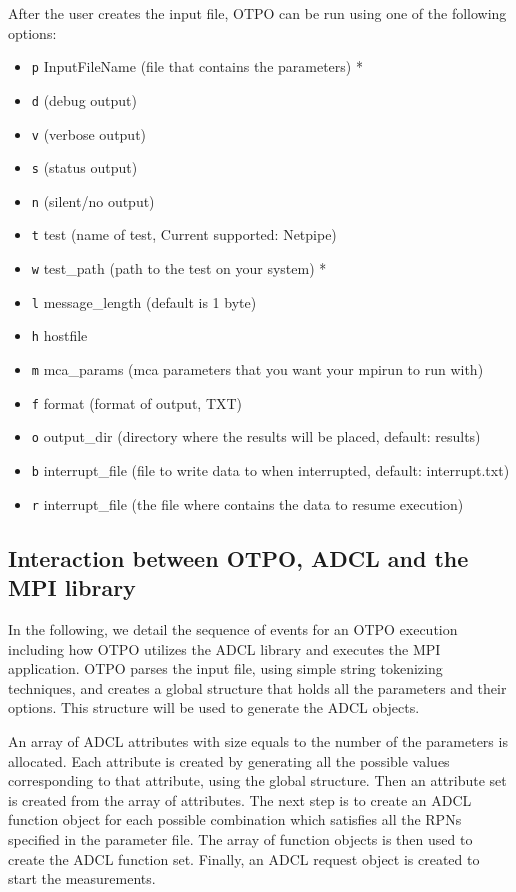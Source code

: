 After the user creates the input file, OTPO can be run using one of the following options:
\begin{itemize}
\item {\tt p} InputFileName (file that contains the parameters) *
\item {\tt d} (debug output)
\item {\tt v} (verbose output)
\item {\tt s} (status output)
\item {\tt n} (silent/no output)
\item {\tt t} test (name of test, Current supported: Netpipe)
\item {\tt w} test\_path (path to the test on your system) *
\item {\tt l} message\_length (default is 1 byte)
\item {\tt h} hostfile
\item {\tt m} mca\_params (mca parameters that you want your mpirun to run with)
\item {\tt f} format (format of output, TXT)
\item {\tt o} output\_dir (directory where the results will be placed, default: results)
\item {\tt b} interrupt\_file (file to write data to when interrupted, default:
  interrupt.txt)
\item {\tt r} interrupt\_file (the file where contains the data to resume execution) 
\end{itemize}

\subsection{Interaction between OTPO, ADCL and the MPI library}

In the following, we detail the sequence of events for an OTPO execution including how OTPO utilizes the ADCL library and executes the MPI application. OTPO parses the input file, using simple string tokenizing techniques, and creates a
global structure that holds all the parameters and their options. This
structure will be used to generate the ADCL objects. 

An array of ADCL attributes with size equals to the number of the parameters
is allocated. Each attribute is created by generating all the possible values
corresponding to that attribute, using the global structure. Then an attribute
set is created from the array of attributes. The next step is to create an
ADCL function object for each possible combination which satisfies all the RPNs specified in
the parameter file. The array of function objects is then used to create the ADCL function set. 
Finally, an ADCL request object is created to start the measurements.

